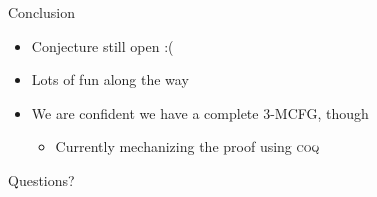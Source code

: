 \documentclass{beamer}
\begin{document}
  \begin{frame}{Conclusion}
    \begin{itemize}
    \item Conjecture still open :(
    \item Lots of fun along the way
    \item We are confident we have a complete 3-MCFG, though
      \begin{itemize}
      \item Currently mechanizing the proof using \textsc{coq}
      \end{itemize}
    \end{itemize}
  \end{frame}
  
  \begin{frame}[standout]
    Questions?
  \end{frame}
  
  	
\end{document}
